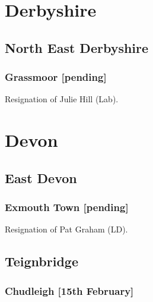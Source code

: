 \documentclass[a4paper,openany]{book}
\begin{document}
\begin{resultsiii}
\section{Derbyshire}

\subsection*{North East Derbyshire}

\subsubsection*{Grassmoor \hspace*{\fill}\nolinebreak[1]%
\enspace\hspace*{\fill}
[pending]}


Resignation of Julie Hill (Lab).

\section{Devon}

\subsection*{East Devon}

\subsubsection*{Exmouth Town \hspace*{\fill}\nolinebreak[1]%
\enspace\hspace*{\fill}
[pending]}


Resignation of Pat Graham (LD).

\subsection*{Teignbridge}

\subsubsection*{Chudleigh \hspace*{\fill}\nolinebreak[1]%
\enspace\hspace*{\fill}
[15th February]}


\end{resultsiii}
\end{document}
